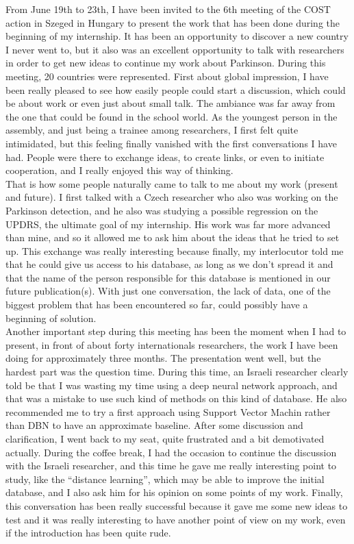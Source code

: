 \documentclass{report}
\begin{document}
	From June 19th to 23th, I have been invited to the 6th meeting of the COST action in Szeged in Hungary to present the work that has been done during the beginning of my internship. It has been an opportunity to discover a new country I never went to, but it also was an excellent opportunity to talk with researchers in order to get new ideas to continue my work about Parkinson. During this meeting, 20 countries were represented.
	First about global impression, I have been really pleased to see how easily people could start a discussion, which could be about work or even just about small talk. The ambiance was far away from the one that could be found in the school world. As the youngest person in the assembly, and just being a trainee among researchers, I first felt quite intimidated, but this feeling finally vanished with the first conversations I have had. People were there to exchange ideas, to create links, or even to initiate cooperation, and I really enjoyed this way of thinking.\\
	
	That is how some people naturally came to talk to me about my work (present and future). I first talked with a Czech researcher who also was working on the Parkinson detection, and he also was studying a possible regression on the UPDRS, the ultimate goal of my internship. His work was far more advanced than mine, and so it allowed me to ask him about the ideas that he tried to set up. This exchange was really interesting because finally, my interlocutor told me that he could give us access to his database, as long as we don't spread it and that the name of the person responsible for this database is mentioned in our future publication(s). With just one conversation, the lack of data, one of the biggest problem that has been encountered so far, could possibly have a beginning of solution.\\
	
	Another important step during this meeting has been the moment when I had to present, in front of about forty internationals researchers, the work I have been doing for approximately three months. The presentation went well, but the hardest part was the question time. During this time, an Israeli researcher clearly told be that I was wasting my time using a deep neural network approach, and that was a mistake to use such kind of methods on this kind of database. He also recommended me to try a first approach using Support Vector Machin rather than DBN to have an approximate baseline. After some discussion and clarification, I went back to my seat, quite frustrated and a bit demotivated actually. During the coffee break, I had the occasion to continue the discussion with the Israeli researcher, and this time he gave me really interesting point to study, like the “distance learning”, which may be able to improve the initial database, and I also ask him for his opinion on some points  of my work. Finally, this conversation has been really successful because it gave me some new ideas to test and it was really interesting to have another point of view on my work, even if the introduction has been quite rude.\\
	
\end{document}
